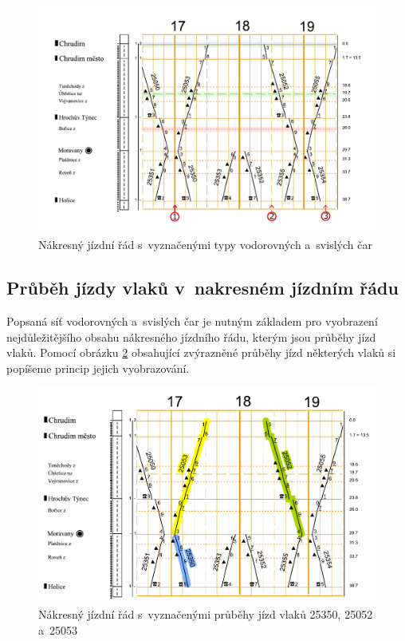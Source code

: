 \begin{figure}[ht]
	\centering
	\includegraphics[width=\textwidth]{../img/kap1_uvod_grafikon_osy}
	\caption{Nákresný jízdní řád s~vyznačenými typy vodorovných a~svislých čar}
	\label{fig:uvod:njr_osy}
\end{figure}

\subsection*{Průběh jízdy vlaků v~nakresném jízdním řádu}
Popsaná síť vodorovných a~svislých čar je nutným základem pro vyobrazení nejdůležitějšího obsahu nákresného jízdního řádu, kterým jsou průběhy jízd vlaků. Pomocí obrázku \ref{fig:uvod:njr_vlaky} obsahující zvýrazněné průběhy jízd některých vlaků si popíšeme princip jejich vyobrazování.

\begin{figure}[ht]
	\centering
	\includegraphics[width=\textwidth]{../img/kap1_uvod_grafikon_vlaky}
	\caption{Nákresný jízdní řád s~vyznačenými průběhy jízd vlaků 25350, 25052 a~25053}
	\label{fig:uvod:njr_vlaky}
\end{figure}

